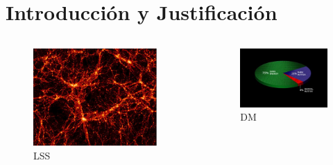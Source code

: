 \documentclass{beamer}
\begin{document}
\section{Introducción y Justificación}
\begin{frame}
	\begin{columns}
		\begin{column}{0.4\textwidth}
			\begin{figure}[!h]
			\begin{center}
				\includegraphics[width=0.9\textwidth]{im/lss.jpg}
				\caption{LSS \footnotemark[2]} 
				\label{fig:arq1}
			\end{center}
		\end{figure}
		\end{column}
		
		\begin{column}{0.4\textwidth}
			\begin{figure}[!h]
			\begin{center}
				\includegraphics[width=1.1\textwidth]{im/DM.jpg}
				\caption{DM \footnotemark[3]} 
				\label{fig:arq2}
			\end{center}
		\end{figure}
		\end{column}
	\end{columns}
	

\end{frame}
\end{document}
